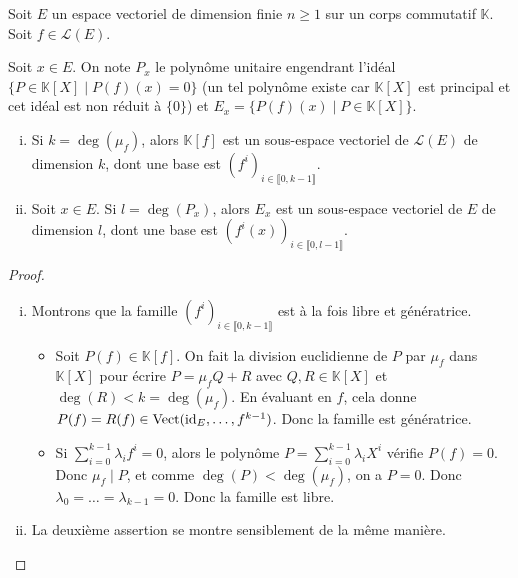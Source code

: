 






	Soit $E$ un espace vectoriel de dimension finie $n \geq 1$ sur un corps commutatif $\mathbb{K}$. Soit $f \in \mathcal{L}(E)$.

	\begin{notation}
		Soit $x \in E$. On note $P_x$ le polynôme unitaire engendrant l'idéal $\{ P \in \mathbb{K}[X] \mid P(f)(x) = 0 \}$ (un tel polynôme existe car $\mathbb{K}[X]$ est principal et cet idéal est non réduit à $\{ 0 \}$) et $E_x = \{ P(f)(x) \mid P \in \mathbb{K}[X] \}$.
	\end{notation}

	\begin{lemma}
		\label{invariants-de-similitude-1}
		\begin{enumerate}[(i)]
			\item Si $k = \deg(\mu_f)$, alors $\mathbb{K}[f]$ est un sous-espace vectoriel de $\mathcal{L}(E)$ de dimension $k$, dont une base est $(f^i)_{i \in \llbracket 0, k-1 \rrbracket}$.
			\item Soit $x \in E$. Si $l = \deg(P_x)$, alors $E_x$ est un sous-espace vectoriel de $E$ de dimension $l$, dont une base est $(f^i(x))_{i \in \llbracket 0, l-1 \rrbracket}$.
		\end{enumerate}
	\end{lemma}


	\begin{proof}
		\begin{enumerate}[(i)]
			\item Montrons que la famille $(f^i)_{i \in \llbracket 0, k-1 \rrbracket}$ est à la fois libre et génératrice.
			\begin{itemize}
				\item Soit $P(f) \in \mathbb{K}[f]$. On fait la division euclidienne de $P$ par $\mu_f$ dans $\mathbb{K}[X]$ pour écrire $P = \mu_f Q + R$ avec $Q, R \in \mathbb{K}[X]$ et $\deg(R) < k = \deg(\mu_f)$. En évaluant en $f$, cela donne $P(f) = R(f) \in \operatorname{Vect}(\operatorname{id}_E, \dots, f^{k-1})$. Donc la famille est génératrice.
				\item Si $\sum_{i=0}^{k-1} \lambda_i f^i = 0$, alors le polynôme $P = \sum_{i=0}^{k-1} \lambda_i X^i$ vérifie $P(f) = 0$. Donc $\mu_f \mid P$, et comme $\deg(P) < \deg(\mu_f)$, on a $P = 0$. Donc $\lambda_0 = \dots = \lambda_{k-1} = 0$. Donc la famille est libre.
			\end{itemize}
			\item La deuxième assertion se montre sensiblement de la même manière.
		\end{enumerate}
	\end{proof}

